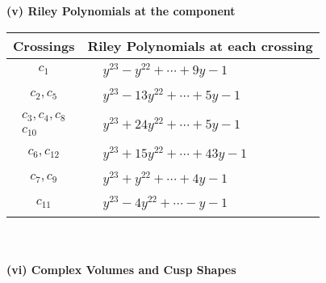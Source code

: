 \documentclass[1p]{elsarticle_modified}
\theoremstyle{definition}
\begin{document}
\newpage\renewcommand{\arraystretch}{1}
\flushleft \textbf{(v) Riley Polynomials at the component}\newline \\
\begin{tabular}{m{50pt}|m{274pt}}
Crossings & \hspace{64pt}Riley Polynomials at each crossing \\
\hline $$\begin{aligned}c_{1}\end{aligned}$$&$\begin{aligned}
&y^{23}- y^{22}+\cdots+9 y-1
\end{aligned}$\\
\hline $$\begin{aligned}c_{2},c_{5}\end{aligned}$$&$\begin{aligned}
&y^{23}-13 y^{22}+\cdots+5 y-1
\end{aligned}$\\
\hline $$\begin{aligned}c_{3},c_{4},c_{8}\\c_{10}\end{aligned}$$&$\begin{aligned}
&y^{23}+24 y^{22}+\cdots+5 y-1
\end{aligned}$\\
\hline $$\begin{aligned}c_{6},c_{12}\end{aligned}$$&$\begin{aligned}
&y^{23}+15 y^{22}+\cdots+43 y-1
\end{aligned}$\\
\hline $$\begin{aligned}c_{7},c_{9}\end{aligned}$$&$\begin{aligned}
&y^{23}+y^{22}+\cdots+4 y-1
\end{aligned}$\\
\hline $$\begin{aligned}c_{11}\end{aligned}$$&$\begin{aligned}
&y^{23}-4 y^{22}+\cdots- y-1
\end{aligned}$\\
\hline
\end{tabular}\\~\\
\newpage\flushleft \textbf{(vi) Complex Volumes and Cusp Shapes}
\end{document}
